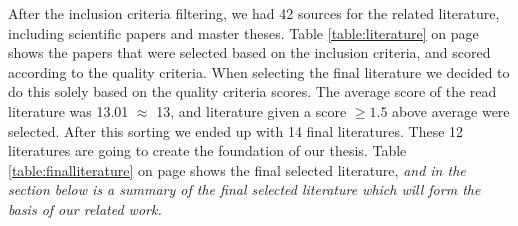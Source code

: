 After the inclusion criteria filtering, we had 42 sources for the related literature, including scientific papers and master theses. Table \ref{table:literature} on page \pageref{table:literature} shows the papers that were selected based on the inclusion criteria, and scored according to the quality criteria. When selecting the final literature we decided to do this solely based on the quality criteria scores. The average score of the read literature was 13.01 $\approx$ 13, and literature given a score $\geq{1.5}$ above average were selected. After this sorting we ended up with 14 final literatures. These 12 literatures are going to create the foundation of our thesis. Table \ref{table:finalliterature} on page \pageref{table:finalliterature} shows the final selected literature, \emph{\color{red} and in the section below is a summary of the final selected literature which will form the basis of our related work.}
